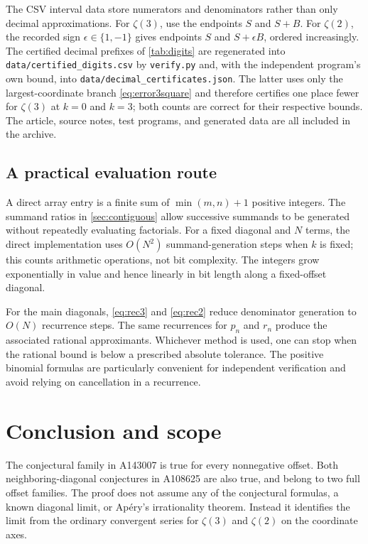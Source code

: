 \documentclass[11pt,letterpaper]{article}
\numberwithin{equation}{section}
\theoremstyle{definition}
\begin{document}
The CSV interval data store numerators and denominators rather than
only decimal approximations. For $\zeta(3)$, use the endpoints
$S$ and $S+B$. For $\zeta(2)$, the recorded sign $\epsilon\in\{1,-1\}$
gives endpoints $S$ and $S+\epsilon B$, ordered increasingly.
The certified decimal prefixes of \cref{tab:digits} are regenerated into
\texttt{data/certified\_digits.csv} by \texttt{verify.py} and, with the
independent program's own bound, into
\texttt{data/decimal\_certificates.json}. The latter uses only the
largest-coordinate branch \eqref{eq:error3square} and therefore certifies
one place fewer for $\zeta(3)$ at $k=0$ and $k=3$; both counts are
correct for their respective bounds.
The article, source notes, test programs, and generated data are all
included in the archive.

\subsection{A practical evaluation route}

A direct array entry is a finite sum of $\min(m,n)+1$ positive integers.
The summand ratios in \cref{sec:contiguous} allow successive summands to
be generated without repeatedly evaluating factorials. For a fixed
diagonal and $N$ terms, the direct implementation uses $O(N^2)$
summand-generation steps when $k$ is fixed; this counts arithmetic
operations, not bit complexity. The integers grow exponentially in
value and hence linearly in bit length along a fixed-offset diagonal.

For the main diagonals, \eqref{eq:rec3} and \eqref{eq:rec2} reduce
denominator generation to $O(N)$ recurrence steps. The same recurrences
for $p_n$ and $r_n$ produce the associated rational approximants.
Whichever method is used, one can stop when the rational bound is below
a prescribed absolute tolerance. The positive binomial formulas are
particularly convenient for independent verification and avoid relying
on cancellation in a recurrence.

\section{Conclusion and scope}\label{sec:conclusion}

The conjectural family in A143007 is true for every nonnegative offset.
Both neighboring-diagonal conjectures in A108625 are also true, and
belong to two full offset families. The proof does not assume any of the
conjectural formulas, a known diagonal limit, or Ap\'ery's irrationality
theorem. Instead it identifies the limit from the ordinary convergent
series for $\zeta(3)$ and $\zeta(2)$ on the coordinate axes.
\end{document}
